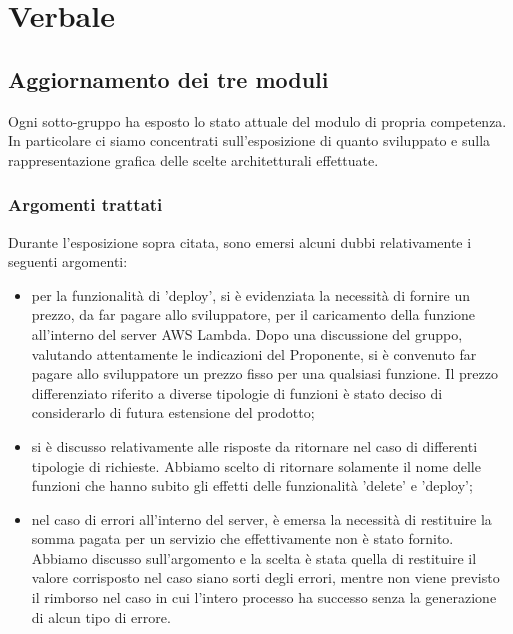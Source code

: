 \section{Verbale}
	\subsection{Aggiornamento dei tre moduli}
		Ogni sotto-gruppo ha esposto lo stato attuale del modulo\textit{} di propria competenza.	In particolare ci siamo concentrati sull'esposizione di quanto sviluppato e sulla rappresentazione grafica delle scelte architetturali effettuate.
		
		\subsubsection{Argomenti trattati}
			Durante l'esposizione sopra citata, sono emersi alcuni dubbi relativamente i seguenti argomenti:
			\begin{itemize}
				\item per la funzionalità di 'deploy', si è evidenziata la necessità di fornire un prezzo, da far pagare allo sviluppatore, per il caricamento della funzione all'interno del server AWS Lambda. Dopo una discussione del gruppo, valutando attentamente le indicazioni del Proponente, si è convenuto far pagare allo sviluppatore un prezzo fisso per una qualsiasi funzione. Il prezzo differenziato riferito a diverse tipologie di funzioni è stato deciso di considerarlo di futura estensione del prodotto;
				\item si è discusso relativamente alle risposte da ritornare nel caso di differenti tipologie di richieste. Abbiamo scelto di ritornare solamente il nome delle funzioni che hanno subito gli effetti delle funzionalità 'delete' e 'deploy';
				\item nel caso di errori all'interno del server, è emersa la necessità di restituire la somma pagata per un servizio che effettivamente non è stato fornito. Abbiamo discusso sull'argomento e la scelta è stata quella di restituire il valore corrisposto nel caso siano sorti degli errori, mentre non viene previsto il rimborso nel caso in cui l'intero processo ha successo senza la generazione di alcun tipo di errore.
			\end{itemize}
		
